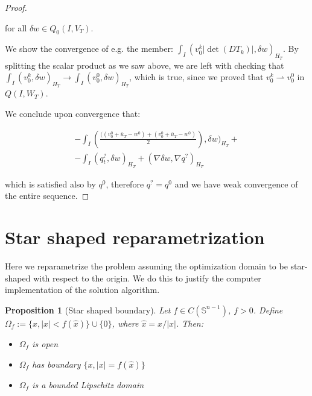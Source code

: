 \documentclass[english,a4paper,12pt,oneside]{scrbook}
\theoremstyle{break}
\newtheorem{prop}[equation]{Proposition}
\newenvironment{mproof}[1][\proofname]{%
  \begin{proof}[#1]$ $\par\nobreak\ignorespaces
}{%
  \end{proof}
}
\renewcommand*{\proofname}{Proof}
\theoremstyle{remark}
\newcommand{\mS}{\mathbb{S}^{n-1}}
\newcommand{\weakc}{\rightharpoonup}
\newcommand{\xh}{\hat{x}}
\begin{document}
\begin{mproof}
for all $\delta w \in Q_0(I,V_{ T})$.

We show the convergence of e.g. the member: $\int_I( v_0^k|\det(DT_k)|,\delta w)_{H_T}$. By splitting the scalar product as we saw above, we are left with checking that $\int_I (v_0^k,\delta w)_{H_T}\rightarrow  \int_I (v_0^0,\delta w)_{H_T}$, which is true, since we proved that $v_0^k \weakc v_0^0$ in $Q(I,W_T)$.

We conclude upon convergence that:

\begin{align*}
-\int_I \left (\frac{((v_0^0+\bar{u}_T - w^0)+(v_0^0+\bar{u}_T - w^0)}{2}\right ),\delta w)_{H_T}+\\
-\int_I (  q^?_t ,   \delta w )_{H_T}+ (\nabla \delta w, \nabla q^?)_{H_T}
\end{align*}

which is satisfied also by $q^0$, therefore $q^? = q^0$ and we have weak convergence of the entire sequence.

\end{mproof}

\section{Star shaped reparametrization}

Here we reparametrize the problem assuming the optimization domain to be star-shaped with respect to the origin. We do this to justify the computer implementation of the solution algorithm.

\begin{prop}[Star shaped boundary]
Let $f \in C(\mS)$, $f>0$. Define $\Omega_f:=\{x, |x|<f(\xh)\}\cup\{0\}$, where $\xh=x/|x|$. Then:
\begin{itemize}
\item $\Omega_f$ is open
\item $\Omega_f$ has boundary $\{x, |x|=f(\xh)\}$
\item $\Omega_f$ is a bounded Lipschitz domain
\end{itemize}
\end{prop}
\end{document}
